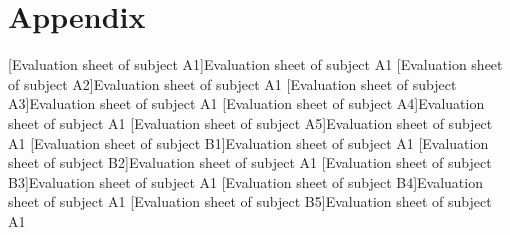 \chapter*{Appendix}

\setcounter{figure}{0}    
\renewcommand{\thefigure}{A. \arabic{figure} }
[Evaluation sheet of subject A1]{Evaluation sheet of subject A1}
[Evaluation sheet of subject A2]{Evaluation sheet of subject A1}
[Evaluation sheet of subject A3]{Evaluation sheet of subject A1}
[Evaluation sheet of subject A4]{Evaluation sheet of subject A1}
[Evaluation sheet of subject A5]{Evaluation sheet of subject A1}
[Evaluation sheet of subject B1]{Evaluation sheet of subject A1}
[Evaluation sheet of subject B2]{Evaluation sheet of subject A1}
[Evaluation sheet of subject B3]{Evaluation sheet of subject A1}
[Evaluation sheet of subject B4]{Evaluation sheet of subject A1}
[Evaluation sheet of subject B5]{Evaluation sheet of subject A1}
